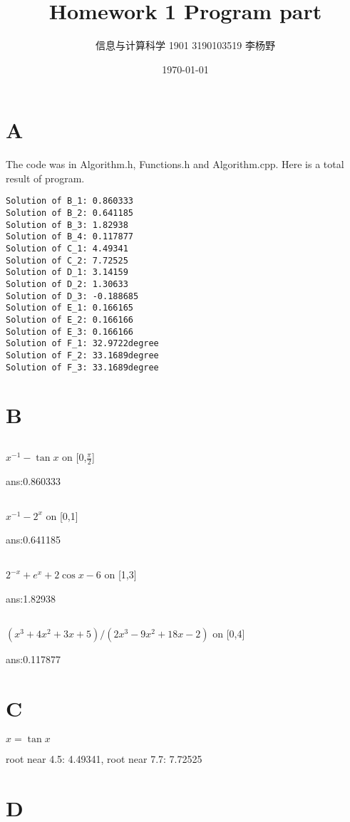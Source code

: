 \documentclass{article}
\title{Homework 1 Program part}
\author{信息与计算科学 1901 3190103519 李杨野}
\date{\today}
\begin{document}
    \maketitle
    \section{A}
    The code was in Algorithm.h, Functions.h and Algorithm.cpp.
    Here is a total result of program.
    \begin{lstlisting}
Solution of B_1: 0.860333
Solution of B_2: 0.641185
Solution of B_3: 1.82938
Solution of B_4: 0.117877
Solution of C_1: 4.49341
Solution of C_2: 7.72525
Solution of D_1: 3.14159
Solution of D_2: 1.30633
Solution of D_3: -0.188685
Solution of E_1: 0.166165
Solution of E_2: 0.166166
Solution of E_3: 0.166166
Solution of F_1: 32.9722degree
Solution of F_2: 33.1689degree
Solution of F_3: 33.1689degree
    \end{lstlisting}
    \section{B}
    \subsection{}
    $x^{-1}-\tan x$ on [0,$\frac{\pi}{2}$] 

    ans:0.860333
    \subsection{}
    $x^{-1}-2^x$ on [0,1] 

    ans:0.641185
    \subsection{}
    $2^{-x}+e^x+2\cos x-6$ on [1,3] 

    ans:1.82938
    \subsection{}
    $(x^3+4x^2+3x+5)/(2x^3-9x^2+18x-2)$ on [0,4] 

    ans:0.117877
    \section{C}
    $x = \tan x$

    root near 4.5: 4.49341, root near 7.7: 7.72525

    \section{D}
\end{document}
